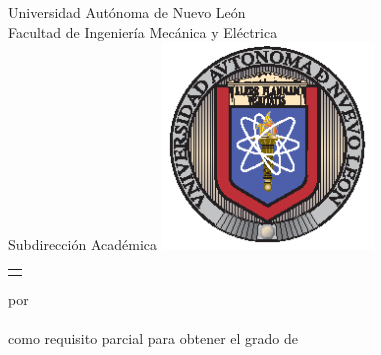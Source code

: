 
\def\uanl{Universidad Autónoma de Nuevo León}
\def\fime{Facultad de Ingeniería Mecánica y Eléctrica}
\def\depg{Subdirección Académica}
\def\snnl{San Nicolás de los Garza, Nuevo León}

\thispagestyle{empty}

\begin{scshape}
\begin{center}
	{\Large \uanl} \\[5mm]
	{\large \fime} \\[5mm]
	{\large \depg}
	\vskip 15mm
	\includegraphics[height=55mm]{uanl}
	\vskip 12mm
	\begin{tabular}{p{11cm}}
		\centering
		{\large \titulo}
	\end{tabular}
	\vskip 7mm
	{por}\\[7mm]
	{\large \autor}\\[7mm]
	{como requisito parcial para obtener el grado de}\\[3mm]
	\MakeUppercase{\grado}\\
	\orientacion
	\vfill
	\fecha
\end{center}
\end{scshape}

\newpage
\thispagestyle{empty}

